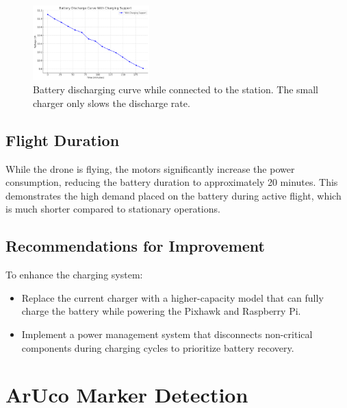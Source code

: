 \begin{figure}[H]
    \centering
    \includegraphics[width=0.4\textwidth]{pictures/Battery_Discharge_Inside.png}
    \caption{Battery discharging curve while connected to the station. The small charger only slows the discharge rate.}
    \label{fig:battery_discharge_curve}
\end{figure}

\subsection{Flight Duration}

While the drone is flying, the motors significantly increase the power consumption, reducing the battery duration to approximately 20 minutes. This demonstrates the high demand placed on the battery during active flight, which is much shorter compared to stationary operations.

\subsection{Recommendations for Improvement}

To enhance the charging system:
\begin{itemize}
    \item Replace the current charger with a higher-capacity model that can fully charge the battery while powering the Pixhawk and Raspberry Pi.
    \item Implement a power management system that disconnects non-critical components during charging cycles to prioritize battery recovery.
\end{itemize}


\section{ArUco Marker Detection}

